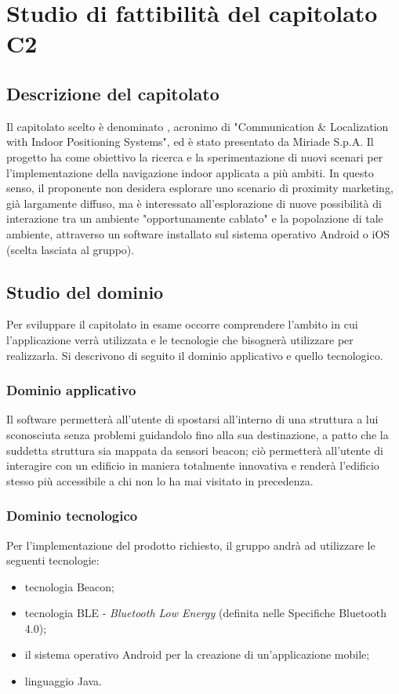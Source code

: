 \documentclass[../StudioDiFattibilita.tex]{subfiles}
\begin{document}
\section{Studio di fattibilità del capitolato C2}
	\subsection{Descrizione del capitolato}
	Il capitolato scelto è denominato \progetto, acronimo di "Communication \& Localization with Indoor Positioning Systems", ed è stato presentato da Miriade S.p.A.
	Il progetto ha come obiettivo la ricerca e la sperimentazione di nuovi scenari per l'implementazione della navigazione indoor applicata a più ambiti.
	In questo senso, il proponente non desidera esplorare uno scenario di proximity marketing, già largamente diffuso, ma è interessato all'esplorazione di nuove possibilità di interazione tra un ambiente "opportunamente cablato" e la popolazione di tale ambiente, attraverso un software installato sul sistema operativo Android o iOS (scelta lasciata al gruppo).
	\subsection{Studio del dominio}
	Per sviluppare il capitolato in esame occorre comprendere l'ambito in cui l'applicazione verrà utilizzata e le tecnologie che bisognerà utilizzare per realizzarla. Si descrivono di seguito il dominio applicativo e quello tecnologico.
		\subsubsection{Dominio applicativo}
		Il software permetterà all'utente di spostarsi all'interno di una struttura a lui sconosciuta senza problemi guidandolo fino alla sua destinazione, a patto che la suddetta struttura sia mappata da sensori beacon; ciò permetterà all'utente di interagire con un edificio in maniera totalmente innovativa e renderà l'edificio stesso più accessibile a chi non lo ha mai visitato in precedenza.
		\subsubsection{Dominio tecnologico}
		Per l'implementazione del prodotto richiesto, il gruppo andrà ad utilizzare le seguenti tecnologie:
			\begin{itemize}
				\item tecnologia Beacon;
				\item tecnologia BLE - \textit{Bluetooth Low Energy} (definita nelle Specifiche Bluetooth 4.0);
				\item il sistema operativo Android per la creazione di un'applicazione mobile;
				\item linguaggio Java.
			\end{itemize}
\end{document}
